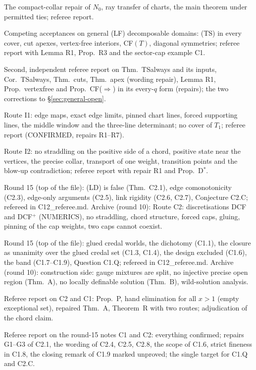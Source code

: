 \documentclass[11pt]{article}
\theoremstyle{definition}
\theoremstyle{remark}
\begin{document}
\begin{description}[leftmargin=*,font=\normalfont\ttfamily,style=nextline]
\item[N27\_notes.md, N27\_referee.md] The compact-collar repair of $N_0$, ray transfer of charts, the main theorem under permitted ties; referee report.
\item[N28\_notes.md, N28\_referee.md] Competing acceptances on general (LF) decomposable domains: (TS) in every cover, cut apexes, vertex-free interiors, CF$(T)$, diagonal symmetries; referee report with Lemma R1, Prop.~R3 and the sector-cap example C1.
\item[TS\_second\_referee.md] Second, independent referee report on Thm.~TSalways and its inputs, Cor.~TSalways, Thm.~cuts, Thm.~apex (wording repair), Lemma R1, Prop.~vertexfree and Prop.~CF($\Rightarrow$) in its every-$q$ form (repairs); the two corrections to \S\ref{sec:general-open}.
\item[I1\_notes.md, I1\_referee.md] Route I1: edge maps, exact edge limits, pinned chart lines, forced supporting lines, the middle window and the three-line determinant; no cover of $T_1$; referee report (CONFIRMED, repairs R1--R7).
\item[I2\_notes.md, I2\_referee.md] Route I2: no straddling on the positive side of a chord, positive state near the vertices, the precise collar, transport of one weight, transition points and the blow-up contradiction; referee report with repair R1 and Prop.~D$^*$.
\item[C2\_notes.md] Round 15 (top of the file): (LD) is false (Thm.~C2.1), edge comonotonicity (C2.3), edge-only arguments (C2.5), link rigidity (C2.6, C2.7), Conjecture C2.C; refereed in C12\_referee.md. Archive (round 10): Route C2: discretisations DCF and DCF$^+$ (NUMERICS), no straddling, chord structure, forced caps, gluing, pinning of the cap weights, two caps cannot coexist.
\item[C1\_notes.md] Round 15 (top of the file): glued credal worlds, the dichotomy (C1.1), the closure as unanimity over the glued credal set (C1.3, C1.4), the design excluded (C1.6), the band (C1.7--C1.9), Question C1.Q; refereed in C12\_referee.md. Archive (round 10): construction side: gauge mixtures are split, no injective precise open region (Thm.~A), no locally definable solution (Thm.~B), wild-solution analysis.
\item[C1C2\_referee.md] Referee report on C2 and C1: Prop.~P, hand elimination for all $x>1$ (empty exceptional set), repaired Thm.~A, Theorem~R with two routes; adjudication of the chord claim.
\item[C12\_referee.md] Referee report on the round-15 notes C1 and C2: everything confirmed; repairs G1--G3 of C2.1, the wording of C2.4, C2.5, C2.8, the scope of C1.6, strict fineness in C1.8, the closing remark of C1.9 marked unproved; the single target for C1.Q and C2.C.

\end{description}
\end{document}
